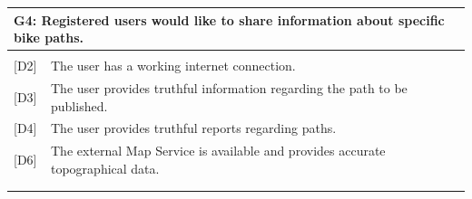 \newpage
\begin{table}[H]
    \centering
    \renewcommand{\arraystretch}{1.5}
    
    \begin{tabularx}{\textwidth}{|l X|}
        \hline
        \multicolumn{2}{|p{\dimexpr\textwidth-2\tabcolsep}|}{\textbf{G4}: Registered users would like to share information about specific bike paths.} \\
        \hline
        & \\[-1em] %
        
        {[D2]} & The user has a working internet connection. \\
        {[D3]} & The user provides truthful information regarding the path to be published. \\
        {[D4]} & The user provides truthful reports regarding paths. \\
        {[D6]} & The external Map Service is available and provides accurate topographical data.\\
        & \\
        \hline
        & \\[-1em]
        

\end{tabularx}
\end{table}
